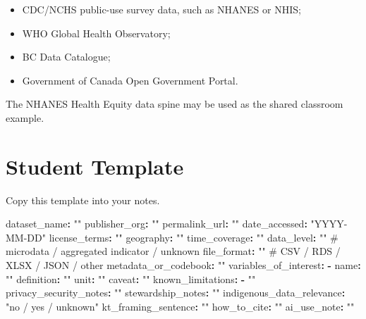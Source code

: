 \documentclass[
  letterpaper,
  DIV=11,
  numbers=noendperiod,
  oneside]{scrreprt}
\newenvironment{Shaded}{\begin{snugshade}}{\end{snugshade}}
\newcommand{\AttributeTok}[1]{\textcolor[rgb]{0.40,0.45,0.13}{#1}}
\newcommand{\CommentTok}[1]{\textcolor[rgb]{0.37,0.37,0.37}{#1}}
\newcommand{\FunctionTok}[1]{\textcolor[rgb]{0.28,0.35,0.67}{#1}}
\newcommand{\KeywordTok}[1]{\textcolor[rgb]{0.00,0.23,0.31}{\textbf{#1}}}
\newcommand{\StringTok}[1]{\textcolor[rgb]{0.13,0.47,0.30}{#1}}
\providecommand{\tightlist}{%
  \setlength{\itemsep}{0pt}\setlength{\parskip}{0pt}}
\begin{document}
\begin{itemize}
\tightlist
\item
  CDC/NCHS public-use survey data, such as NHANES or NHIS;
\item
  WHO Global Health Observatory;
\item
  BC Data Catalogue;
\item
  Government of Canada Open Government Portal.
\end{itemize}

The NHANES Health Equity data spine may be used as the shared classroom
example.

\section*{Student Template}\label{student-template}


Copy this template into your notes.

\begin{Shaded}
\begin{Highlighting}[numbers=left,,]
\FunctionTok{dataset\_name}\KeywordTok{:}\AttributeTok{ }\StringTok{""}
\FunctionTok{publisher\_org}\KeywordTok{:}\AttributeTok{ }\StringTok{""}
\FunctionTok{permalink\_url}\KeywordTok{:}\AttributeTok{ }\StringTok{""}
\FunctionTok{date\_accessed}\KeywordTok{:}\AttributeTok{ }\StringTok{"YYYY{-}MM{-}DD"}
\FunctionTok{license\_terms}\KeywordTok{:}\AttributeTok{ }\StringTok{""}
\FunctionTok{geography}\KeywordTok{:}\AttributeTok{ }\StringTok{""}
\FunctionTok{time\_coverage}\KeywordTok{:}\AttributeTok{ }\StringTok{""}
\FunctionTok{data\_level}\KeywordTok{:}\AttributeTok{ }\StringTok{""}\CommentTok{   \# microdata / aggregated indicator / unknown}
\FunctionTok{file\_format}\KeywordTok{:}\AttributeTok{ }\StringTok{""}\CommentTok{  \# CSV / RDS / XLSX / JSON / other}
\FunctionTok{metadata\_or\_codebook}\KeywordTok{:}\AttributeTok{ }\StringTok{""}
\FunctionTok{variables\_of\_interest}\KeywordTok{:}
\AttributeTok{  }\KeywordTok{{-}}\AttributeTok{ }\FunctionTok{name}\KeywordTok{:}\AttributeTok{ }\StringTok{""}
\AttributeTok{    }\FunctionTok{definition}\KeywordTok{:}\AttributeTok{ }\StringTok{""}
\AttributeTok{    }\FunctionTok{unit}\KeywordTok{:}\AttributeTok{ }\StringTok{""}
\AttributeTok{    }\FunctionTok{caveat}\KeywordTok{:}\AttributeTok{ }\StringTok{""}
\FunctionTok{known\_limitations}\KeywordTok{:}
\AttributeTok{  }\KeywordTok{{-}}\AttributeTok{ }\StringTok{""}
\FunctionTok{privacy\_security\_notes}\KeywordTok{:}\AttributeTok{ }\StringTok{""}
\FunctionTok{stewardship\_notes}\KeywordTok{:}\AttributeTok{ }\StringTok{""}
\FunctionTok{indigenous\_data\_relevance}\KeywordTok{:}\AttributeTok{ }\StringTok{"no / yes / unknown"}
\FunctionTok{kt\_framing\_sentence}\KeywordTok{:}\AttributeTok{ }\StringTok{""}
\FunctionTok{how\_to\_cite}\KeywordTok{:}\AttributeTok{ }\StringTok{""}
\FunctionTok{ai\_use\_note}\KeywordTok{:}\AttributeTok{ }\StringTok{""}
\end{Highlighting}
\end{Shaded}
\end{document}

